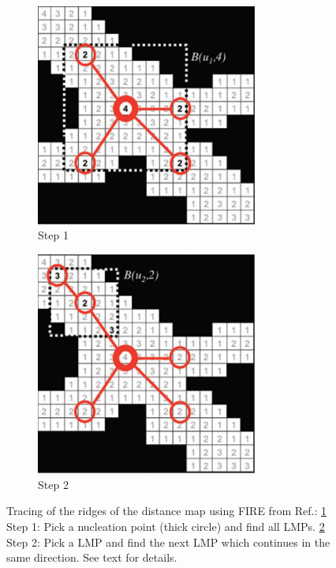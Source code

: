 \begin{figure}[H]
  \centering
  \begin{subfigure}{0.5\textwidth}
    \centering
    \includegraphics[width=0.8\textwidth]{Figures/chapter-image/fire/nucleation1.png}%
    \caption{Step 1}
    \label{LMP1}
  \end{subfigure}%
  \begin{subfigure}{0.5\textwidth}
    \centering
    \includegraphics[width=0.8\textwidth]{Figures/chapter-image/fire/nucleation2.png}
    \caption{Step 2}
    \label{LMP2}
  \end{subfigure}
  \caption[FIRE algorithm - Find LMP]{Tracing of the ridges of the distance
    map using FIRE from Ref.\citep{stein_algorithm_2008}: \ref{LMP1} Step 1:
    Pick a nucleation point (thick circle) and find all LMPs. \ref{LMP2} Step 2:
    Pick a LMP and find the next LMP which continues in the same direction. See
  text for details.}
  \label{fig:fire_LMPS}
\end{figure}

